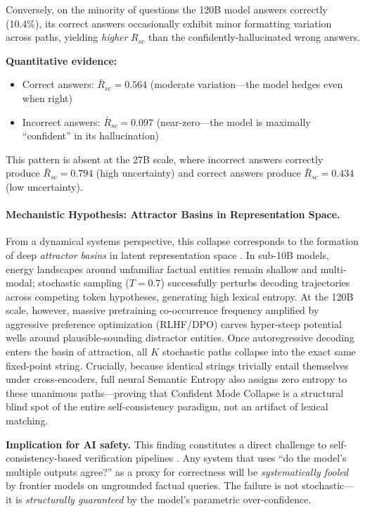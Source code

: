 \documentclass[11pt]{article}
\begin{document}
Conversely, on the minority of questions the 120B model answers correctly (10.4\%), its correct answers occasionally exhibit minor formatting variation across paths, yielding \textit{higher} $R_{sc}$ than the confidently-hallucinated wrong answers.

\textbf{Quantitative evidence:}
\begin{itemize}
    \item Correct answers: $\bar{R}_{sc} = 0.564$ (moderate variation---the model hedges even when right)
    \item Incorrect answers: $\bar{R}_{sc} = 0.097$ (near-zero---the model is maximally ``confident'' in its hallucination)
\end{itemize}

This pattern is absent at the 27B scale, where incorrect answers correctly produce $\bar{R}_{sc} = 0.794$ (high uncertainty) and correct answers produce $\bar{R}_{sc} = 0.434$ (low uncertainty).

\paragraph{Mechanistic Hypothesis: Attractor Basins in Representation Space.}
From a dynamical systems perspective, this collapse corresponds to the formation of deep \textit{attractor basins} in latent representation space \cite{simhi2025trust}. In sub-10B models, energy landscapes around unfamiliar factual entities remain shallow and multi-modal; stochastic sampling ($T=0.7$) successfully perturbs decoding trajectories across competing token hypotheses, generating high lexical entropy. At the 120B scale, however, massive pretraining co-occurrence frequency amplified by aggressive preference optimization (RLHF/DPO) carves hyper-steep potential wells around plausible-sounding distractor entities. Once autoregressive decoding enters the basin of attraction, all $K$ stochastic paths collapse into the exact same fixed-point string. Crucially, because identical strings trivially entail themselves under cross-encoders, full neural Semantic Entropy \cite{kuhn2023semantic} also assigns zero entropy to these unanimous paths---proving that Confident Mode Collapse is a structural blind spot of the entire self-consistency paradigm, not an artifact of lexical matching.

\textbf{Implication for AI safety.} This finding constitutes a direct challenge to self-consistency-based verification pipelines \cite{wang2022self}. Any system that uses ``do the model's multiple outputs agree?'' as a proxy for correctness will be \textit{systematically fooled} by frontier models on ungrounded factual queries. The failure is not stochastic---it is \textit{structurally guaranteed} by the model's parametric over-confidence.
\end{document}
